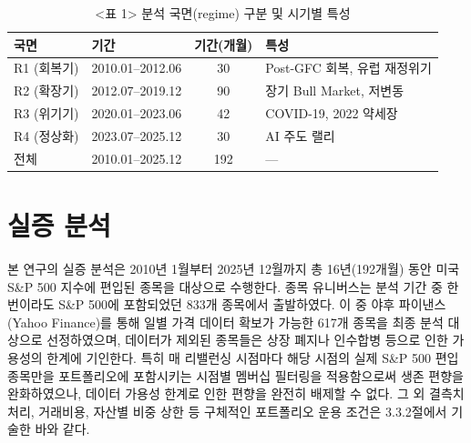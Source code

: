 \documentclass{article}
\begin{document}
\begin{table}[ht]
\centering
\caption{<표 1> 분석 국면(regime) 구분 및 시기별 특성}
\label{tab:regimes}
\begin{tabular}{llcl}
\toprule
국면 & 기간 & 기간(개월) & 특성 \\
\midrule
R1 (회복기)  & 2010.01--2012.06 & 30 & Post-GFC 회복, 유럽 재정위기 \\
R2 (확장기)  & 2012.07--2019.12 & 90 & 장기 Bull Market, 저변동 \\
R3 (위기기)  & 2020.01--2023.06 & 42 & COVID-19, 2022 약세장 \\
R4 (정상화)  & 2023.07--2025.12 & 30 & AI 주도 랠리 \\
\midrule
\multicolumn{1}{l}{전체} & 2010.01--2025.12 & 192 & --- \\
\bottomrule
\end{tabular}
\end{table}































































\section{실증 분석}\label{sec:result}

본 연구의 실증 분석은 2010년 1월부터 2025년 12월까지 총 16년(192개월) 동안 미국 S\&P 500 지수에 편입된 종목을 대상으로 수행한다. 종목 유니버스는 분석 기간 중 한 번이라도 S\&P 500에 포함되었던 833개 종목에서 출발하였다. 이 중 야후 파이낸스(Yahoo Finance)를 통해 일별 가격 데이터 확보가 가능한 617개 종목을 최종 분석 대상으로 선정하였으며, 데이터가 제외된 종목들은 상장 폐지나 인수합병 등으로 인한 가용성의 한계에 기인한다. 특히 매 리밸런싱 시점마다 해당 시점의 실제 S\&P 500 편입 종목만을 포트폴리오에 포함시키는 시점별 멤버십 필터링을 적용함으로써 생존 편향을 완화하였으나, 데이터 가용성 한계로 인한 편향을 완전히 배제할 수 없다. 그 외 결측치 처리, 거래비용, 자산별 비중 상한 등 구체적인 포트폴리오 운용 조건은 3.3.2절에서 기술한 바와 같다.
\end{document}
